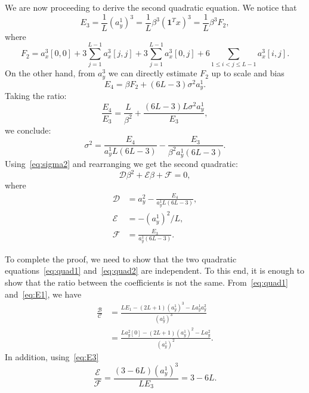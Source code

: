 \documentclass[english,11pt]{article}
\newcommand{\1}{\mathbf{1}}
\numberwithin{equation}{section}
\theoremstyle{plain}
\theoremstyle{definition}
\theoremstyle{remark}
\theoremstyle{plain}
\theoremstyle{remark}
\theoremstyle{plain}
\theoremstyle{plain}
\newcommand{\one}{\mathbf{1}}
\begin{document}
We are now proceeding to derive the second quadratic equation. We notice that 
\begin{equation} \label{eq:E3}
E_3  = \frac{1}{L}(a_y^1)^3 = \frac{1}{L}\beta^3 (\one ^Tx)^3   = \frac{1}{L}\beta^3 F_2,
\end{equation}
where 
\begin{equation*}
F_2 =  a_x^3[0,0] + 3\sum_{j=1}^{L-1}a_x^3[j,j] + 3\sum_{j=1}^{L-1}a_x^3[0,j] + 6\sum_{1\leq i < j\leq L-1}a_x^3[i,j].
\end{equation*}
On the other hand, from $a_y^3$ we can directly estimate $F_2$ up to scale and bias
\begin{equation} \label{eq:E4}
E_4 = \beta F_2 + (6L-3)\sigma^2a_y^1.
\end{equation}
Taking the ratio:
\begin{equation*} 
\frac{E_4}{E_3} = \frac{L}{\beta^2} + \frac{(6L-3)L\sigma^2a_y^1}{E_3}, 
\end{equation*}
we conclude:
\begin{equation*}
\sigma^2 = \frac{E_4}{a_y^1L(6L-3)}  - \frac{E_3}{\beta^2a_y^1(6L-3)}.
\end{equation*}
Using~\eqref{eq:sigma2} and rearranging we get the second quadratic:
\begin{equation} \label{eq:quad2}
\mathcal{D}\beta^2 + \mathcal{E}\beta + \mathcal{F} = 0,
\end{equation}
where
\begin{align*}
\mathcal{D} &= a_y^2 - \frac{E_4}{a_y^1L(6L-3)}, \\ 
\mathcal{E} &= -(a_y^1)^2/L, \\
\mathcal{F} &= \frac{E_3}{a_y^1(6L-3)}.
\end{align*}

To complete the proof, we need to show that the two quadratic equations~\eqref{eq:quad1} and~\eqref{eq:quad2} are independent. To this end, it is enough to show that the ratio between the coefficients is not the same. 
From~\eqref{eq:quad1} and~\eqref{eq:E1}, we have 
\begin{equation*}
\begin{split}
\frac{\mathcal{B}}{\mathcal{C}} &= \frac{LE_1 - (2L+1)(a_y^1)^3 - La_y^1a_y^2}{(a_y^1)^3} \\&= \frac{La_y^2[0] - (2L+1)(a_y^1)^2 - La_y^2}{(a_y^1)^2}.
\end{split}
\end{equation*}
In addition, using~\eqref{eq:E3}
\begin{equation*}
\frac{\mathcal{E}}{\mathcal{F}} = \frac{(3-6L)(a_y^1)^3}{LE_3} = 3 - 6L . 
\end{equation*}
\end{document}
